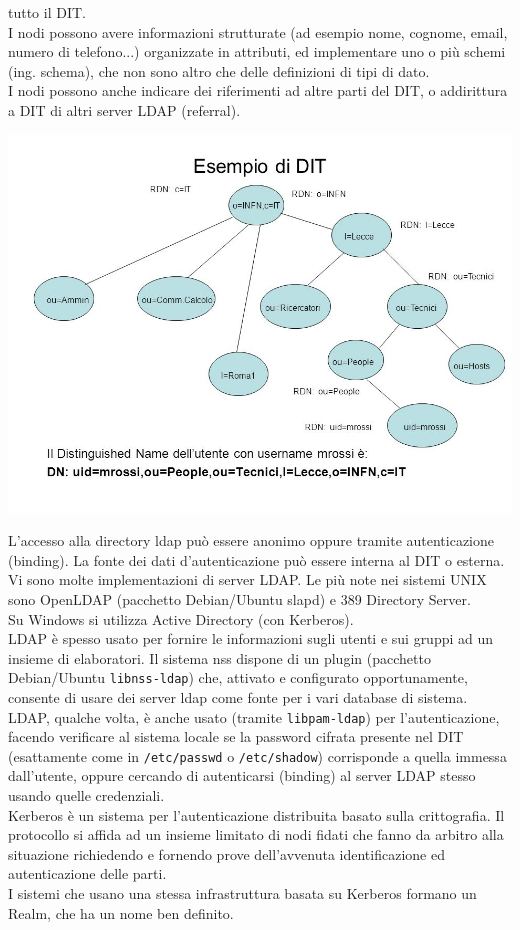 \documentclass[a4paper]{report}
\begin{document}
tutto il DIT.\\
I nodi possono avere informazioni strutturate (ad esempio nome, cognome,
email, numero di telefono...) organizzate in attributi, ed implementare uno o
più schemi (ing. schema), che non sono altro che delle definizioni di tipi di dato.\\
I nodi possono anche indicare dei riferimenti ad altre parti del DIT, o addirittura a
DIT di altri server LDAP (referral).\\
\begin{center}
\includegraphics[scale=0.5]{dit.png}
\end{center}
L'accesso alla directory ldap può essere
anonimo oppure tramite autenticazione
(binding). La fonte dei dati d'autenticazione può
essere interna al DIT o esterna.\\
Vi sono molte implementazioni di server LDAP.
Le più note nei sistemi UNIX sono OpenLDAP
(pacchetto Debian/Ubuntu slapd) e 389 Directory
Server.\\
Su Windows si utilizza Active Directory (con Kerberos).\\

LDAP è spesso usato per fornire le informazioni sugli utenti
e sui gruppi ad un insieme di elaboratori. Il sistema nss
dispone di un plugin (pacchetto Debian/Ubuntu \texttt{libnss-ldap})
che, attivato e configurato opportunamente,
consente di usare dei server ldap come fonte per i vari
database di sistema.\\
LDAP, qualche volta, è anche usato (tramite \texttt{libpam-ldap})
per l'autenticazione, facendo verificare al sistema
locale se la password cifrata presente nel DIT (esattamente
come in \texttt{/etc/passwd} o \texttt{/etc/shadow}) corrisponde a
quella immessa dall'utente, oppure cercando di autenticarsi
(binding) al server LDAP stesso usando quelle credenziali.\\
Kerberos è un sistema per l'autenticazione
distribuita basato sulla crittografia. Il
protocollo si affida ad un insieme limitato di
nodi fidati che fanno da arbitro alla situazione
richiedendo e fornendo prove dell'avvenuta
identificazione ed autenticazione delle parti.\\
I sistemi che usano una stessa infrastruttura
basata su Kerberos formano un Realm, che ha
un nome ben definito.\\
\end{document}
